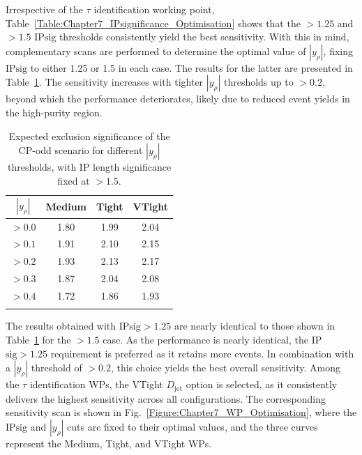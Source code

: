 Irrespective of the $\tau$ identification working point, Table~\ref{Table:Chapter7_IPsignificance_Optimisation} shows that the $>1.25$ and $>1.5$ IP$\text{sig}$ thresholds consistently yield the best sensitivity. With this in mind, complementary scans are performed to determine the optimal value of $|y_\rho|$, fixing IP$\text{sig}$ to either 1.25 or 1.5 in each case. The results for the latter are presented in Table~\ref{Table:Chapter7_yrho_Optimisation}. The sensitivity increases with tighter $|y_\rho|$ thresholds up to $>0.2$, beyond which the performance deteriorates, likely due to reduced event yields in the high-purity region.

\begin{table}[!htbp]
\centering
\renewcommand{\arraystretch}{1.5} %
\setlength{\tabcolsep}{10pt} %
\begin{tabular}{c c c c}
\hline
$|y_\rho|$ & Medium & Tight & VTight \\
\hline
$>0.0$ & 1.80 & 1.99 & 2.04 \\
\arrayrulecolor{lightgray} \hline
$>0.1$           & 1.91 & 2.10 & 2.15 \\
\arrayrulecolor{lightgray} \hline

$>0.2$           & 1.93 & 2.13 & 2.17 \\
\arrayrulecolor{lightgray} \hline

$>0.3$           & 1.87 & 2.04 & 2.08 \\
\arrayrulecolor{lightgray} \hline

$>0.4$           & 1.72 & 1.86 & 1.93 \\
\arrayrulecolor{black} \hline
\end{tabular}
\caption{Expected exclusion significance of the CP-odd scenario for different $|y_\rho|$ thresholds, with IP length significance fixed at $>1.5$.}
\label{Table:Chapter7_yrho_Optimisation}
\end{table}

The results obtained with IP$\text{sig}>1.25$ are nearly identical to those shown in Table~\ref{Table:Chapter7_yrho_Optimisation} for the $>1.5$ case. As the performance is nearly identical, the IP$\text{sig}>1.25$ requirement is preferred as it retains more events. In combination with a $|y_\rho|$ threshold of $>0.2$, this choice yields the best overall sensitivity. Among the $\tau$ identification \acp{WP}, the VTight $D_{\text{jet}}$ option is selected, as it consistently delivers the highest sensitivity across all configurations. The corresponding sensitivity scan is shown in Fig.~\ref{Figure:Chapter7_WP_Optimisation}, where the IP$\text{sig}$ and $|y_\rho|$ cuts are fixed to their optimal values, and the three curves represent the Medium, Tight, and VTight \acp{WP}.

